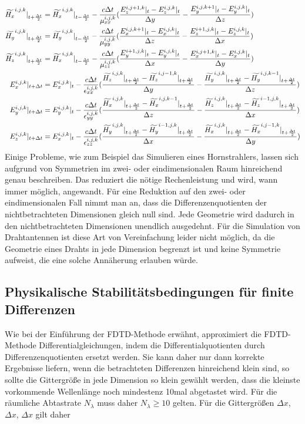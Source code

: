 \documentclass[11pt, ngerman]{article}
\begin{document}
\begin{align}
	\Hf{x}{i,j,k}{+} &= \Hf{x}{i,j,k}{-} - \frac{c\Delta t}{\mu_{xx}^{i,j,k}}(\frac{\Ef{z}{i,j+1,k}{0} - \Ef{z}{i,j,k}{0}}{\Delta y} - \frac{\Ef{y}{i,j,k+1}{0} - \Ef{y}{i,j,k}{0}}{\Delta z}) \label{eq:update_hx_npml}\\
	\Hf{y}{i,j,k}{+} &= \Hf{y}{i,j,k}{-} - \frac{c\Delta t}{\mu_{yy}^{i,j,k}}(\frac{\Ef{x}{i,j,k+1}{0} - \Ef{x}{i,j,k}{0}}{\Delta z} - \frac{\Ef{z}{i+1,j,k}{0} - \Ef{z}{i,j,k}{0}}{\Delta x}) \\
	\Hf{z}{i,j,k}{+} &= \Hf{x}{i,j,k}{-} - \frac{c\Delta t}{\mu_{zz}^{i,j,k}}(\frac{\Ef{y}{i+1,j,k}{0} - \Ef{y}{i,j,k}{0}}{\Delta x} - \frac{\Ef{x}{i,j+1,k}{0} - \Ef{x}{i,j,k}{0}}{\Delta y})\\
	\Ef{x}{i,j,k}{+} &= \Ef{x}{i,j,k}{0} - \frac{c\Delta t}{\epsilon_{xx}^{i,j,k}}(\frac{\Hf{z}{i,j,k}{+} - \Hf{z}{i,j-1,k}{+}}{\Delta y} - \frac{\Hf{y}{i,j,k}{+} - \Hf{y}{i,j,k-1}{+}}{\Delta z}) \label{eq:update_ex_npml}\\
	\Ef{y}{i,j,k}{+} &= \Ef{y}{i,j,k}{0} - \frac{c\Delta t}{\epsilon_{yy}^{i,j,k}}(\frac{\Hf{x}{i,j,k}{+} - \Hf{x}{i,j,k-1}{+}}{\Delta z} - \frac{\Hf{z}{i,j,k}{+} - \Hf{z}{i-1,j,k}{+}}{\Delta x})\\
	\Ef{z}{i,j,k}{+} &= \Ef{x}{i,j,k}{0} - \frac{c\Delta t}{\epsilon_{zz}^{i,j,k}}(\frac{\Hf{y}{i,j,k}{+} - \Hf{y}{i-1,j,k}{+}}{\Delta x} - \frac{\Hf{x}{i,j,k}{+} - \Hf{x}{i,j-1,k}{+}}{\Delta y})
\end{align}
Einige Probleme, wie zum Beispiel das Simulieren eines Hornstrahlers, lassen sich aufgrund von Symmetrien im zwei- oder eindimensionalen Raum hinreichend genau beschreiben.
Das reduziert die n\"otige Rechenleistung und wird, wann immer m\"oglich, angewandt. F\"ur eine Reduktion auf den zwei- oder eindimensionalen Fall nimmt man an, dass die
Differenzenquotienten der nichtbetrachteten Dimensionen gleich null sind. Jede Geometrie wird dadurch in den nichtbetrachteten Dimensionen unendlich ausgedehnt.\cite{dimension_reduction}
F\"ur die Simulation von Drahtantennen ist diese Art von Vereinfachung leider nicht m\"oglich, da die Geometrie eines Drahts in jede Dimension begrenzt ist und keine
Symmetrie aufweist, die eine solche Ann\"aherung erlauben w\"urde.

\subsection{Physikalische Stabilit\"atsbedingungen f\"ur finite Differenzen}
Wie bei der Einf\"uhrung der FDTD-Methode erw\"ahnt, approximiert die FDTD-Methode Differentialgleichungen, indem
die Differentialquotienten durch Differenzenquotienten ersetzt werden. Sie kann daher nur dann korrekte Ergebnisse
liefern, wenn die betrachteten Differenzen hinreichend klein sind, so sollte die Gittergr\"o{\ss}e in jede Dimension
so klein gew\"ahlt werden, dass die kleinste vorkommende Wellenl\"ange noch mindestenz 10mal abgetastet wird.
F\"ur die r\"aumliche Abtastrate \(N_\lambda\) muss daher \(N_\lambda \geq 10\) gelten\cite{grid_stability_condition}.
F\"ur die Gittergr\"o{\ss}en \(\Delta x\), \(\Delta x\), \(\Delta x\) gilt daher
\end{document}
